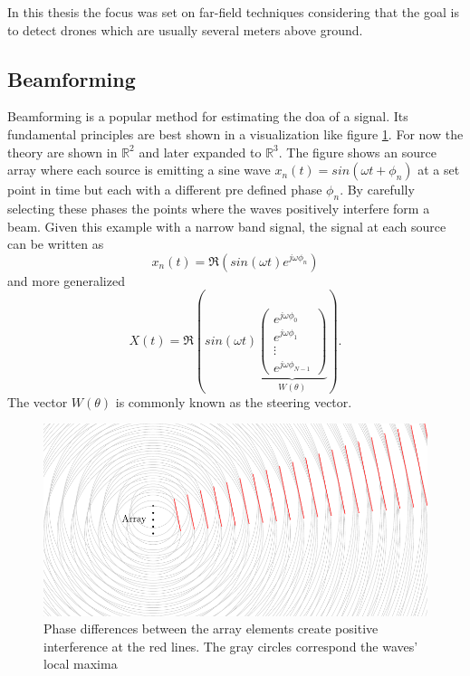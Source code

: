 In this thesis the focus was set on far-field techniques considering that the
goal is to detect drones which are usually several meters above ground.

\subsection{Beamforming}
Beamforming is a popular method for estimating the \acrshort{doa} of a signal.
Its fundamental principles are best shown in a visualization like 
figure \ref{ssl:fig:beamforming1}. 
For now the theory are shown in $\mathbb{R}^2$ and later expanded to $\mathbb{R}^3$.
The figure shows an source array where each source is emitting a
sine wave $x_n(t) = sin(\omega t + \phi_n)$ at a set point in time but each with a different
pre defined phase $\phi_n$.
By carefully selecting these phases the points where the waves positively
interfere form a beam.
Given this example with a narrow band signal, the signal at each source
can be written as
\begin{equation}
  x_n(t) = \Re(sin(\omega t) e^{j\omega \phi_n})
\end{equation}
and more generalized
\begin{equation}
  X(t) = 
  \Re\left(
    sin(\omega t)
    \underbrace{\begin{pmatrix} e^{j\omega \phi_0} \\ 
                    e^{j\omega \phi_1} \\
                    \vdots \\ 
                    e^{j\omega \phi_{N-1}} 
      \end{pmatrix}}_{W(\theta)}
  \right).
\end{equation}
The vector $W(\theta)$ is commonly known as the steering vector.

\begin{figure}
  \centering
  \includegraphics[]{beamforming_1.pdf}
  \caption{Phase differences between the array elements create positive interference at the red lines.
  The gray circles correspond the waves' local maxima}
  \label{ssl:fig:beamforming1}
\end{figure}


